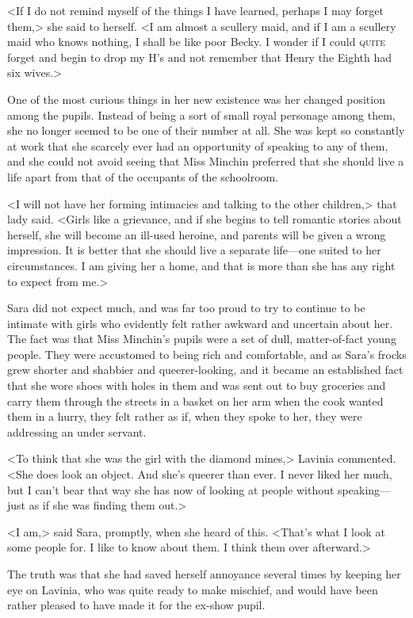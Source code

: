 <If I do not remind myself of the things I have learned, perhaps I may forget them,> she said to herself. <I am almost a scullery maid, and if I am a scullery maid who knows nothing, I shall be like poor Becky. I wonder if I could \textsc{quite} forget and begin to drop my H's and not remember that Henry the Eighth had six wives.>

One of the most curious things in her new existence was her changed position among the pupils. Instead of being a sort of small royal personage among them, she no longer seemed to be one of their number at all. She was kept so constantly at work that she scarcely ever had an opportunity of speaking to any of them, and she could not avoid seeing that Miss Minchin preferred that she should live a life apart from that of the occupants of the schoolroom.

<I will not have her forming intimacies and talking to the other children,> that lady said. <Girls like a grievance, and if she begins to tell romantic stories about herself, she will become an ill-used heroine, and parents will be given a wrong impression. It is better that she should live a separate life—one suited to her circumstances. I am giving her a home, and that is more than she has any right to expect from me.>

Sara did not expect much, and was far too proud to try to continue to be intimate with girls who evidently felt rather awkward and uncertain about her. The fact was that Miss Minchin's pupils were a set of dull, matter-of-fact young people. They were accustomed to being rich and comfortable, and as Sara's frocks grew shorter and shabbier and queerer-looking, and it became an established fact that she wore shoes with holes in them and was sent out to buy groceries and carry them through the streets in a basket on her arm when the cook wanted them in a hurry, they felt rather as if, when they spoke to her, they were addressing an under servant.

<To think that she was the girl with the diamond mines,> Lavinia commented. <She does look an object. And she's queerer than ever. I never liked her much, but I can't bear that way she has now of looking at people without speaking—just as if she was finding them out.>

<I am,> said Sara, promptly, when she heard of this. <That's what I look at some people for. I like to know about them. I think them over afterward.>

The truth was that she had saved herself annoyance several times by keeping her eye on Lavinia, who was quite ready to make mischief, and would have been rather pleased to have made it for the ex-show pupil.

